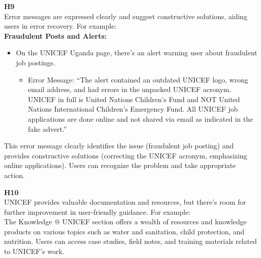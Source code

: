 \documentclass{article}
\begin{document}
\begin{description}
    \item {\textbf{H9} \color{unicefGray}{Help users recognize, diagnose, and recover from errors}}\\
    Error messages are expressed clearly and suggest constructive solutions, aiding users in error recovery. For example:\\
    \textbf{Fraudulent Posts and Alerts:}
    \begin{itemize}
        \item On the UNICEF Uganda page, there’s an alert warning user about fraudulent job postings.
        \begin{itemize}
            \item Error Message: “The alert contained an outdated UNICEF logo, wrong email address, and had errors in the unpacked UNICEF acronym. UNICEF in full is United Nations Children’s Fund and NOT United Nations International Children’s Emergency Fund. All UNICEF job applications are done online and not shared via email as indicated in the fake advert.”
        \end{itemize}
    \end{itemize}
    This error message clearly identifies the issue (fraudulent job posting) and provides constructive solutions (correcting the UNICEF acronym, emphasizing online applications). Users can recognize the problem and take appropriate action.
\end{description}
\begin{description}
    \item {\textbf{H10} \color{unicefGray}{Help and documentation}}\\
    UNICEF provides valuable documentation and resources, but there’s room for further improvement in user-friendly guidance. For example:\\
    The Knowledge @ UNICEF section offers a wealth of resources and knowledge products on various topics such as water and sanitation, child protection, and nutrition. Users can access case studies, field notes, and training materials related to UNICEF’s work.
\end{description}
\end{document}
